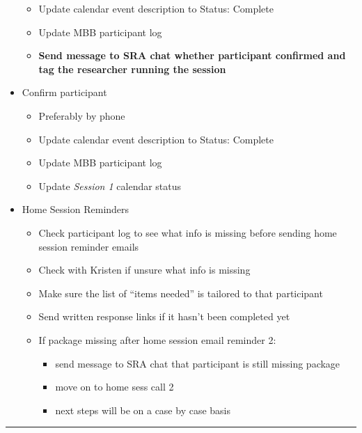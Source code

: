 \documentclass[]{book}
\providecommand{\tightlist}{%
  \setlength{\itemsep}{0pt}\setlength{\parskip}{0pt}}
\begin{document}
\begin{itemize}
  \begin{itemize}
  \tightlist
  \item
    Update calendar event description to Status: Complete
  \item
    Update MBB participant log
  \item
    \textbf{Send message to SRA chat whether participant confirmed and tag the researcher running the session}
  \end{itemize}
\item
  Confirm participant

  \begin{itemize}
  \tightlist
  \item
    Preferably by phone
  \item
    Update calendar event description to Status: Complete
  \item
    Update MBB participant log
  \item
    Update \emph{Session 1} calendar status
  \end{itemize}
\item
  Home Session Reminders

  \begin{itemize}
  \tightlist
  \item
    Check participant log to see what info is missing before sending home session reminder emails
  \item
    Check with Kristen if unsure what info is missing
  \item
    Make sure the list of ``items needed'' is tailored to that participant
  \item
    Send written response links if it hasn't been completed yet
  \item
    If package missing after home session email reminder 2:

    \begin{itemize}
    \tightlist
    \item
      send message to SRA chat that participant is still missing package
    \item
      move on to home sess call 2
    \item
      next steps will be on a case by case basis
    \end{itemize}
  \end{itemize}
\end{itemize}

\begin{center}\rule{0.5\linewidth}{0.5pt}\end{center}
\end{document}
